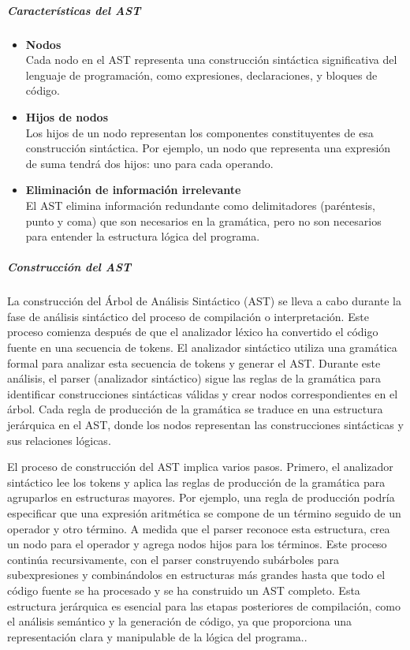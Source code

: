 \subparagraph{Características del AST}

\begin{itemize}
  \item \textbf{Nodos} \\
  Cada nodo en el AST representa una construcción sintáctica significativa del lenguaje de programación, como expresiones, declaraciones, y bloques de código.
  \item \textbf{Hijos de nodos} \\
  Los hijos de un nodo representan los componentes constituyentes de esa construcción sintáctica. Por ejemplo, un nodo que representa una expresión de suma tendrá dos hijos: uno para cada operando.
  \item \textbf{Eliminación de información irrelevante} \\
  El AST elimina información redundante como delimitadores (paréntesis, punto y coma) que son necesarios en la gramática, pero no son necesarios para entender la estructura lógica del programa.
\end{itemize}

\subparagraph{Construcción del AST}
La construcción del Árbol de Análisis Sintáctico (AST) se lleva a cabo durante la fase de análisis sintáctico del proceso de compilación o interpretación. Este proceso comienza después de que el analizador léxico ha convertido el código fuente en una secuencia de tokens. El analizador sintáctico utiliza una gramática formal para analizar esta secuencia de tokens y generar el AST. Durante este análisis, el parser (analizador sintáctico) sigue las reglas de la gramática para identificar construcciones sintácticas válidas y crear nodos correspondientes en el árbol. Cada regla de producción de la gramática se traduce en una estructura jerárquica en el AST, donde los nodos representan las construcciones sintácticas y sus relaciones lógicas.

El proceso de construcción del AST implica varios pasos. Primero, el analizador sintáctico lee los tokens y aplica las reglas de producción de la gramática para agruparlos en estructuras mayores. Por ejemplo, una regla de producción podría especificar que una expresión aritmética se compone de un término seguido de un operador y otro término. A medida que el parser reconoce esta estructura, crea un nodo para el operador y agrega nodos hijos para los términos. Este proceso continúa recursivamente, con el parser construyendo subárboles para subexpresiones y combinándolos en estructuras más grandes hasta que todo el código fuente se ha procesado y se ha construido un AST completo. Esta estructura jerárquica es esencial para las etapas posteriores de compilación, como el análisis semántico y la generación de código, ya que proporciona una representación clara y manipulable de la lógica del programa.. \parencite{Jeffery2021}

